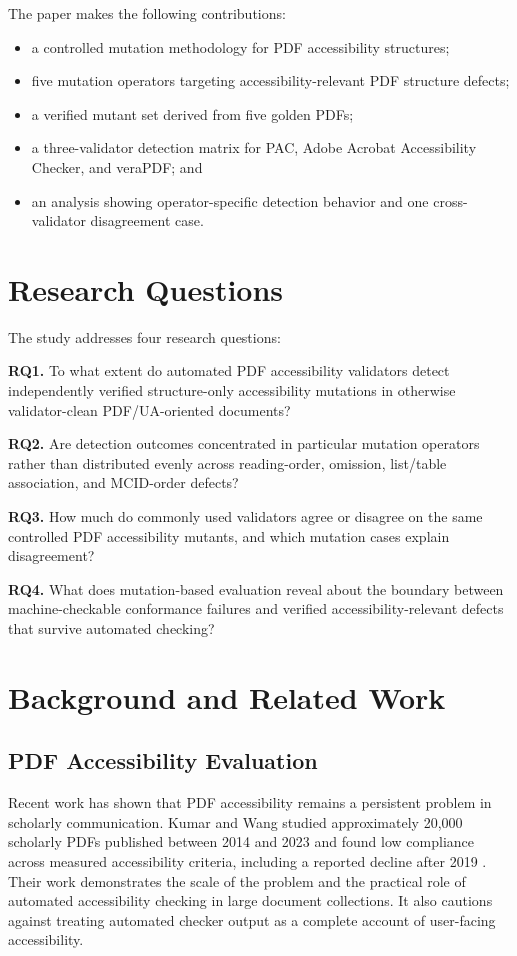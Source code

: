 \documentclass[conference]{IEEEtran}
\begin{document}
The paper makes the following contributions:
\begin{itemize}
    \item a controlled mutation methodology for PDF accessibility structures;
    \item five mutation operators targeting accessibility-relevant PDF structure defects;
    \item a verified mutant set derived from five golden PDFs;
    \item a three-validator detection matrix for PAC, Adobe Acrobat Accessibility Checker, and veraPDF; and
    \item an analysis showing operator-specific detection behavior and one cross-validator disagreement case.
\end{itemize}

\section{Research Questions}

The study addresses four research questions:

\textbf{RQ1.} To what extent do automated PDF accessibility validators detect independently verified structure-only accessibility mutations in otherwise validator-clean PDF/UA-oriented documents?

\textbf{RQ2.} Are detection outcomes concentrated in particular mutation operators rather than distributed evenly across reading-order, omission, list/table association, and MCID-order defects?

\textbf{RQ3.} How much do commonly used validators agree or disagree on the same controlled PDF accessibility mutants, and which mutation cases explain disagreement?

\textbf{RQ4.} What does mutation-based evaluation reveal about the boundary between machine-checkable conformance failures and verified accessibility-relevant defects that survive automated checking?

\section{Background and Related Work}

\subsection{PDF Accessibility Evaluation}

Recent work has shown that PDF accessibility remains a persistent problem in scholarly communication. Kumar and Wang studied approximately 20,000 scholarly PDFs published between 2014 and 2023 and found low compliance across measured accessibility criteria, including a reported decline after 2019 \cite{kumar2024crisis}. Their work demonstrates the scale of the problem and the practical role of automated accessibility checking in large document collections. It also cautions against treating automated checker output as a complete account of user-facing accessibility.
\end{document}
